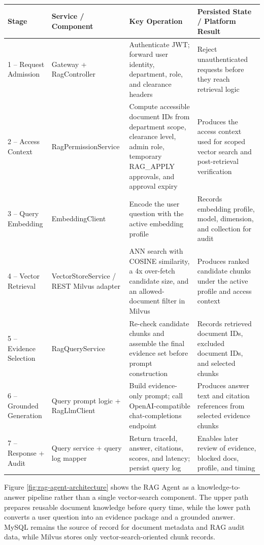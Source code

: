 \begin{table}[H]
{\small
\begin{tabular}{@{}p{1.8cm}>{\raggedright\arraybackslash}p{3.3cm}p{4.3cm}>{\raggedright\arraybackslash}p{\dimexpr\textwidth-9.4cm-6\tabcolsep\relax}@{}}
\toprule
\textbf{Stage} & \textbf{Service / Component} & \textbf{Key Operation} & \textbf{Persisted State / Platform Result} \\
\midrule
1 -- Request Admission & Gateway + RagController & Authenticate JWT; forward user identity, department, role, and clearance headers & Reject unauthenticated requests before they reach retrieval logic \\
2 -- Access Context & RagPermissionService & Compute accessible document IDs from department scope, clearance level, admin role, temporary RAG\_APPLY approvals, and approval expiry & Produces the access context used for scoped vector search and post-retrieval verification \\
3 -- Query Embedding & EmbeddingClient & Encode the user question with the active embedding profile & Records embedding profile, model, dimension, and collection for audit \\
4 -- Vector Retrieval & VectorStoreService / \newline REST Milvus adapter & ANN search with COSINE similarity, a 4x over-fetch candidate size, and an allowed-document filter in Milvus & Produces ranked candidate chunks under the active profile and access context \\
5 -- Evidence Selection & RagQueryService & Re-check candidate chunks and assemble the final evidence set before prompt construction & Records retrieved document IDs, excluded document IDs, and selected chunks \\
6 -- Grounded Generation & Query prompt logic + \newline RagLlmClient & Build evidence-only prompt; call OpenAI-compatible chat-completions endpoint & Produces answer text and citation references from selected evidence chunks \\
7 -- Response + Audit & Query service + \newline query log mapper & Return traceId, answer, citations, scores, and latency; persist query log & Enables later review of evidence, blocked docs, profile, and timing \\
\bottomrule
\end{tabular}
}
\end{table}

Figure \ref{fig:rag-agent-architecture} shows the RAG Agent as a knowledge-to-answer pipeline rather than a single vector-search component. The upper path prepares reusable document knowledge before query time, while the lower path converts a user question into an evidence package and a grounded answer. MySQL remains the source of record for document metadata and RAG audit data, while Milvus stores only vector-search-oriented chunk records.


